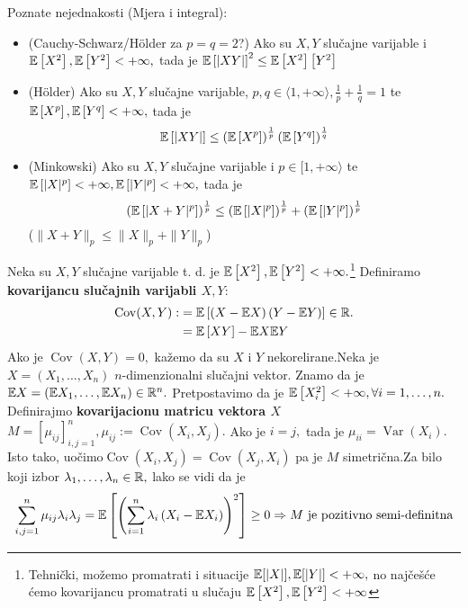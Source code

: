 \documentclass{article}
\newcommand{\Var}{\operatorname{Var}}
\newcommand{\Cov}{\operatorname{Cov}}
\begin{document}
Poznate nejednakosti (Mjera i integral):
\begin{itemize}
    \item[\ding{113}] (Cauchy-Schwarz/H\"{o}lder za \(p=q=2\)?) Ako su \(X,Y\) slučajne varijable i \(\Bbb E\left[X^2\right],\Bbb E\left[Y^2\right]<+\infty,\) tada je \(\Bbb E\left[|XY|\right]^2\le\Bbb E\left[X^2\right]\left[Y^2\right]\)
    \item[\ding{113}] (H\"{o}lder) Ako su \(X,Y\) slučajne varijable, \(p,q\in\langle 1,+\infty\rangle,\frac1p+\frac1q=1\) te \(\Bbb E\left[X^p\right],\Bbb E\left[Y^q\right]<+\infty,\) tada je \[\Bbb E\left[|XY|\right]\le\left(\Bbb E\left[X^p\right]\right)^\frac1p\left(\Bbb E\left[Y^q\right]\right)^\frac1q\]
    \item[\ding{113}] (Minkowski) Ako su \(X,Y\) slučajne varijable i \(p\in[1,+\infty\rangle\) te \(\Bbb E\left[|X|^p\right]<+\infty,\Bbb E\left[|Y|^p\right]<+\infty,\) tada je \[\left(\Bbb E\left[|X+Y|^p\right]\right)^\frac1p\le\left(\Bbb E\left[|X|^p\right]\right)^\frac1p+\left(\Bbb E\left[|Y|^p\right]\right)^\frac1p\] (\(\|X+Y\|_p\le\|X\|_p+\|Y\|_p\))
\end{itemize}
Neka su \(X,Y\) slučajne varijable t. d. je \(\Bbb E\left[X^2\right],\Bbb E\left[Y^2\right]<+\infty.\)\footnote[10]{Tehnički, možemo promatrati i situacije \(\Bbb E[|X|],\Bbb E[|Y|]<+\infty,\) no najčešće ćemo kovarijancu promatrati u slučaju \(\Bbb E\left[X^2\right],\Bbb E\left[Y^2\right]<+\infty\)} Definiramo \textbf{kovarijancu slučajnih varijabli \(X,Y\)}:\[\begin{aligned}\Cov (X,Y):&=\Bbb E\left[\left(X-\Bbb EX\right)\left(Y-\Bbb EY\right)\right]\in\Bbb R.\\&=\Bbb E\left[XY\right]-\Bbb EX\Bbb EY\end{aligned}\]
Ako je \(\Cov (X,Y)=0,\) kažemo da su \(X\) i \(Y\) nekorelirane.\newline Neka je \(X=(X_1,\ldots,X_n)\) \(n\)-dimenzionalni slučajni vektor. Znamo da je \(\Bbb EX=\left(\Bbb EX_1,\ldots,\Bbb EX_n\right)\in\Bbb R^n.\) Pretpostavimo da je \(\Bbb E\left[X_i^2\right]<+\infty,\forall i=1,\ldots,n.\) Definirajmo \textbf{kovarijacionu matricu vektora \(X\)}\newline \(M=\left[\mu_{ij}\right]_{i,j=1}^n,\mu_{ij}:=\Cov \left(X_i,X_j\right).\) Ako je \(i=j,\) tada je \(\mu_{ii}=\Var \left(X_i\right).\) Isto tako, uočimo\newline \(\Cov \left(X_i,X_j\right)=\Cov \left(X_j,X_i\right)\) pa je \(M\) simetrična.\newline Za bilo koji izbor \(\lambda_1,\ldots,\lambda_n\in\Bbb R,\) lako se vidi da je \[\sum_{i,j=1}^n\mu_{ij}\lambda_i\lambda_j=\Bbb E\left[\left(\sum_{i=1}^n\lambda_i\left(X_i-\Bbb EX_i\right)\right)^2\right]\ge 0\Rightarrow M\text{ je pozitivno semi-definitna}\]
\newpage
\end{document}
